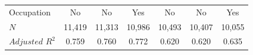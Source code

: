 \documentclass[serif, aspectratio=169]{beamer}
\begin{document}
\begin{frame}
\begin{table}[htbp]
\begin{tabular}{@{}l*{6}{c}@{}}
Occupation&       No         &       No         &      Yes         &       No         &       No         &      Yes         \\
$\textit{N}$&   11,419         &   11,313         &   10,986         &   10,493         &   10,407         &   10,055         \\
$\textit{Adjusted R}^2$&    0.759         &    0.760         &    0.772         &    0.620         &    0.620         &    0.635         \\
\bottomrule
\end{tabular}
\\\\
\\


\label{table:basic_DID_Monthly_income}

\end{table}

\end{frame}

\end{document}
